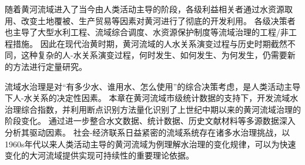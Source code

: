 随着黄河流域进入了当今由人类活动主导的阶段，各级利益相关者通过水资源取用、改变土地覆被、生产贸易等因素对黄河进行了彻底的开发利用。
各级决策者也主导了大型水利工程、流域综合调度、水资源保护制度等流域治理的工程/非工程措施。
因此在现代治黄时期，黄河流域的人水关系演变过程与历史时期截然不同，这种复杂的人-水关系演变过程，何时发生、如何发生、为何发生，仍需要新的方法进行定量研究。

流域水治理是对“有多少水、谁用水、怎么使用”的综合决策考虑，是人类活动主导下人-水关系的决定性因素。
本章在黄河流域市级统计数据的支持下，开发流域水治理综合指数，并利用断点识别方法量化识别了上世纪中期以来的黄河流域治理的阶段变化。
通过进一步整合水文数据、统计数据、历史文献材料等多源数据深入分析其驱动因素。
社会-经济联系日益紧密的流域系统存在诸多水治理挑战，以1960s年代以来人类活动主导的黄河流域为例理解水治理的变化规律，可以为快速变化的大河流域提供实现可持续性的重要理论依据。
